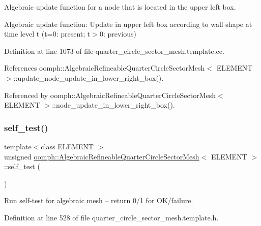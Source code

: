 Algebraic update function for a node that is located in the upper left box. 

Algebraic update function\+: Update in upper left box according to wall shape at time level t (t=0\+: present; t$>$0\+: previous) 

Definition at line 1073 of file quarter\+\_\+circle\+\_\+sector\+\_\+mesh.\+template.\+cc.



References oomph\+::\+Algebraic\+Refineable\+Quarter\+Circle\+Sector\+Mesh$<$ E\+L\+E\+M\+E\+N\+T $>$\+::update\+\_\+node\+\_\+update\+\_\+in\+\_\+lower\+\_\+right\+\_\+box().



Referenced by oomph\+::\+Algebraic\+Refineable\+Quarter\+Circle\+Sector\+Mesh$<$ E\+L\+E\+M\+E\+N\+T $>$\+::node\+\_\+update\+\_\+in\+\_\+lower\+\_\+right\+\_\+box().

\mbox{\label{classoomph_1_1AlgebraicRefineableQuarterCircleSectorMesh_a68d9738e3d3eedc4d2dd8e1b7fb09d8c}} 
\subsubsection{\texorpdfstring{self\+\_\+test()}{self\_test()}}
{\footnotesize\ttfamily template$<$class E\+L\+E\+M\+E\+NT $>$ \\
unsigned \hyperlink{classoomph_1_1AlgebraicRefineableQuarterCircleSectorMesh}{oomph\+::\+Algebraic\+Refineable\+Quarter\+Circle\+Sector\+Mesh}$<$ E\+L\+E\+M\+E\+NT $>$\+::self\+\_\+test (\begin{DoxyParamCaption}{ }\end{DoxyParamCaption})\hspace{0.3cm}{\ttfamily [inline]}}



Run self-\/test for algebraic mesh -- return 0/1 for O\+K/failure. 



Definition at line 528 of file quarter\+\_\+circle\+\_\+sector\+\_\+mesh.\+template.\+h.

\mbox{\label{classoomph_1_1AlgebraicRefineableQuarterCircleSectorMesh_a3eb269dc5c26355a808d1c5035190017}} 
